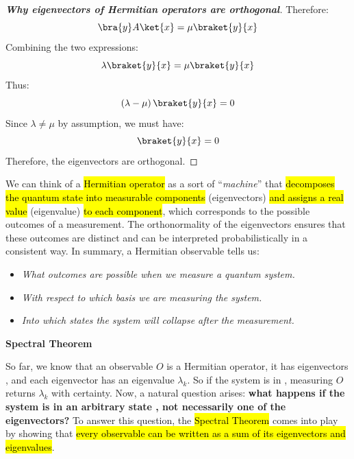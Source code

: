 \begin{enumerate}
\begin{proof}[\textbf{Why eigenvectors of Hermitian operators are orthogonal}]
        Therefore:
        \begin{equation*}
            \bra{y} A \ket{x}
            =
            \mu \braket{y}{x}
        \end{equation*}
        Combining the two expressions:
        \begin{equation*}
            \lambda \braket{y}{x}
            =
            \mu \braket{y}{x}
        \end{equation*}
        Thus:
        \begin{equation*}
            \left(\lambda - \mu\right) \braket{y}{x} = 0
        \end{equation*}
        Since $\lambda \neq \mu$ by assumption, we must have:
        \begin{equation*}
            \braket{y}{x} = 0
        \end{equation*}
        Therefore, the eigenvectors are orthogonal.
    \end{proof}
\end{enumerate}
We can think of a \hl{Hermitian operator} as a sort of ``\emph{machine}'' that \hl{decomposes the quantum state into measurable components} (eigenvectors) \hl{and assigns a real value} (eigenvalue) \hl{to each component}, which corresponds to the possible outcomes of a measurement. The orthonormality of the eigenvectors ensures that these outcomes are distinct and can be interpreted probabilistically in a consistent way. In summary, a Hermitian observable tells us:
\begin{itemize}
    \item \emph{What outcomes are possible when we measure a quantum system.}
    \item \emph{With respect to which basis we are measuring the system.}
    \item \emph{Into which states the system will collapse after the measurement.}
\end{itemize}

\highspace
\begin{flushleft}
    \textcolor{Green3}{ \textbf{Spectral Theorem}}
\end{flushleft}
So far, we know that an observable $O$ is a Hermitian operator, it has eigenvectors , and each eigenvector has an eigenvalue $\lambda_k$. So if the system is in , measuring $O$ returns $\lambda_k$ with certainty. Now, a natural question arises: \textbf{what happens if the system is in an arbitrary state , not necessarily one of the eigenvectors?} To answer this question, the \hl{Spectral Theorem} comes into play by showing that \hl{every observable can be written as a sum of its eigenvectors and eigenvalues}.

